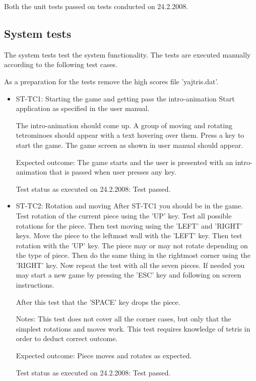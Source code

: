 \documentclass[11pt,a4paper]{article}
\begin{document}
Both the unit tests passed on tests conducted on 24.2.2008.

\subsection {System tests}

The system tests test the system functionality. The tests are executed manually according to the
following test cases.

As a preparation for the tests remove the high scores file 'yajtris.dat'.

\begin{itemize}
  \item ST-TC1: Starting the game and getting pass the intro-animation
    Start application as specified in the user manual.

The intro-animation should come up.
    A group of moving and rotating tetrominoes should appear with a text hovering over them.
    Press a key to start the game. The game screen as shown in user manual should appear.

    Expected outcome: The game starts and the user is presented with an intro-animation that is passed when user presses any key.

    Test status as executed on 24.2.2008: Test passed.

  \item ST-TC2: Rotation and moving
    After ST-TC1 you should be in the game. Test rotation of the current piece using the 'UP' key. Test all
    possible rotations for the piece. Then test moving using the 'LEFT' and 'RIGHT' keys. Move the piece to the leftmost
    wall with the 'LEFT' key. Then test rotation with the 'UP' key. The piece may or may not rotate depending on the type of piece.
    Then do the same thing in the rightmost corner using the 'RIGHT' key. Now repeat the test with all the seven pieces. If needed
    you may start a new game by pressing the 'ESC' key and following on screen instructions.

    After this test that the 'SPACE' key drops the piece.

    Notes: This test does not cover all the corner cases, but only that the simplest rotations and moves work. This test
           requires knowledge of tetris in order to deduct correct outcome.

    Expected outcome: Piece moves and rotates as expected.

    Test status as executed on 24.2.2008: Test passed.


\end{itemize}
\end{document}
